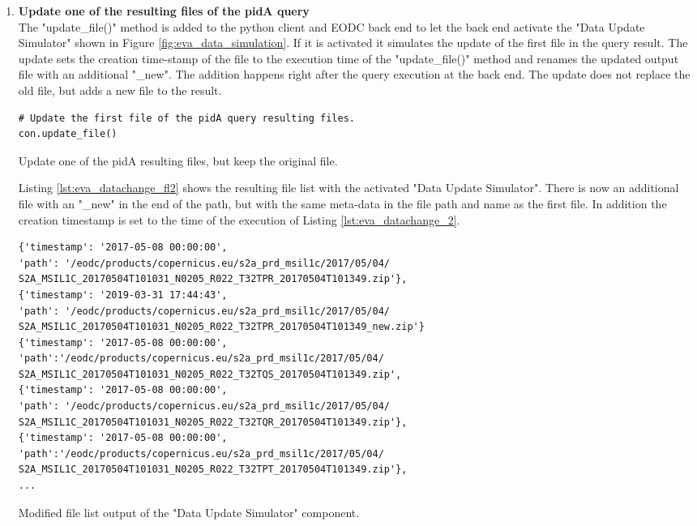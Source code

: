 \documentclass[draft,final]{vutinfth} %
\newenvironment{code}{\captionsetup{type=listing}}{}
\begin{document}
\begin{enumerate}
	\setcounter{enumi}{+1}
	\item \textbf{Update one of the resulting files of the pidA query} \\
The "update\_file()" method is added to the python client and EODC back end to let the back end activate the "Data Update Simulator" shown in Figure \ref{fig:eva_data_simulation}. If it is activated it simulates the update of the first file in the query result. The update sets the creation time-stamp of the file to the execution time of the "update\_file()" method and renames the updated output file with an additional "\_new". The addition happens right after the query execution at the back end. The update does not replace the old file, but adds a new file to the result. 
	\begin{code}
		\begin{verbatim}
# Update the first file of the pidA query resulting files.
con.update_file()
		\end{verbatim}
		\caption{Update one of the pidA resulting files, but keep the original file.}
		\label{lst:eva_datachange_2}
	\end{code}

Listing \ref{lst:eva_datachange_fl2} shows the resulting file list with the activated "Data Update Simulator". There is now an additional file with an "\_new" in the end of the path, but with the same meta-data in the file path and name as the first file. In addition the creation timestamp is set to the time of the execution of Listing \ref{lst:eva_datachange_2}.

	\begin{code}
	\begin{verbatim}
{'timestamp': '2017-05-08 00:00:00', 
'path': '/eodc/products/copernicus.eu/s2a_prd_msil1c/2017/05/04/
S2A_MSIL1C_20170504T101031_N0205_R022_T32TPR_20170504T101349.zip'}, 
{'timestamp': '2019-03-31 17:44:43', 
'path': '/eodc/products/copernicus.eu/s2a_prd_msil1c/2017/05/04/
S2A_MSIL1C_20170504T101031_N0205_R022_T32TPR_20170504T101349_new.zip'}
{'timestamp': '2017-05-08 00:00:00',
'path':'/eodc/products/copernicus.eu/s2a_prd_msil1c/2017/05/04/
S2A_MSIL1C_20170504T101031_N0205_R022_T32TQS_20170504T101349.zip', 
{'timestamp': '2017-05-08 00:00:00', 
'path': '/eodc/products/copernicus.eu/s2a_prd_msil1c/2017/05/04/
S2A_MSIL1C_20170504T101031_N0205_R022_T32TQR_20170504T101349.zip'}, 
{'timestamp': '2017-05-08 00:00:00',
'path':'/eodc/products/copernicus.eu/s2a_prd_msil1c/2017/05/04/
S2A_MSIL1C_20170504T101031_N0205_R022_T32TPT_20170504T101349.zip'},
...
 	\end{verbatim}
	\caption{Modified file list output of the "Data Update Simulator" component.}
	\label{lst:eva_datachange_fl2}
\end{code}
	

\end{enumerate}
\end{document}
